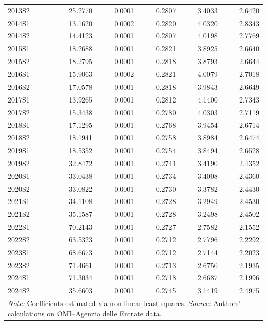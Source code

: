 \begin{landscape}
\begin{table}[!ht]
\begin{tabular}{lrrrrr}
    2013S2 & 25.2770 & 0.0001 & 0.2807 & 3.4033 & 2.6420 \\
    2014S1 & 13.1620 & 0.0002 & 0.2820 & 4.0320 & 2.8343 \\
    2014S2 & 14.4123 & 0.0001 & 0.2807 & 4.0198 & 2.7769 \\
    2015S1 & 18.2688 & 0.0001 & 0.2821 & 3.8925 & 2.6640 \\
    2015S2 & 18.2795 & 0.0001 & 0.2818 & 3.8793 & 2.6644 \\
    2016S1 & 15.9063 & 0.0002 & 0.2821 & 4.0079 & 2.7018 \\
    2016S2 & 17.0578 & 0.0001 & 0.2818 & 3.9843 & 2.6649 \\
    2017S1 & 13.9265 & 0.0001 & 0.2812 & 4.1400 & 2.7343 \\
    2017S2 & 15.3438 & 0.0001 & 0.2780 & 4.0303 & 2.7119 \\
    2018S1 & 17.1295 & 0.0001 & 0.2768 & 3.9454 & 2.6714 \\
    2018S2 & 18.1941 & 0.0001 & 0.2758 & 3.8984 & 2.6474 \\
    2019S1 & 18.5352 & 0.0001 & 0.2754 & 3.8494 & 2.6528 \\
    2019S2 & 32.8472 & 0.0001 & 0.2741 & 3.4190 & 2.4352 \\
    2020S1 & 33.0438 & 0.0001 & 0.2734 & 3.4008 & 2.4360 \\
    2020S2 & 33.0822 & 0.0001 & 0.2730 & 3.3782 & 2.4430 \\
    2021S1 & 34.1108 & 0.0001 & 0.2728 & 3.2949 & 2.4530 \\
    2021S2 & 35.1587 & 0.0001 & 0.2728 & 3.2498 & 2.4502 \\
    2022S1 & 70.2143 & 0.0001 & 0.2727 & 2.7582 & 2.1552 \\
    2022S2 & 63.5323 & 0.0001 & 0.2712 & 2.7796 & 2.2292 \\
    2023S1 & 68.6673 & 0.0001 & 0.2712 & 2.7144 & 2.2023 \\
    2023S2 & 71.4661 & 0.0001 & 0.2713 & 2.6750 & 2.1935 \\
    2024S1 & 71.3034 & 0.0001 & 0.2718 & 2.6687 & 2.1996 \\
    2024S2 & 35.6603 & 0.0001 & 0.2745 & 3.1419 & 2.4975 \\
    \hline
    \multicolumn{6}{l}{\textit{Note:} Coefficients estimated via non-linear least squares. \textit{Source:} Authors' calculations on OMI--Agenzia delle Entrate data.} \\
  \end{tabular}
\end{table}
\end{landscape}
